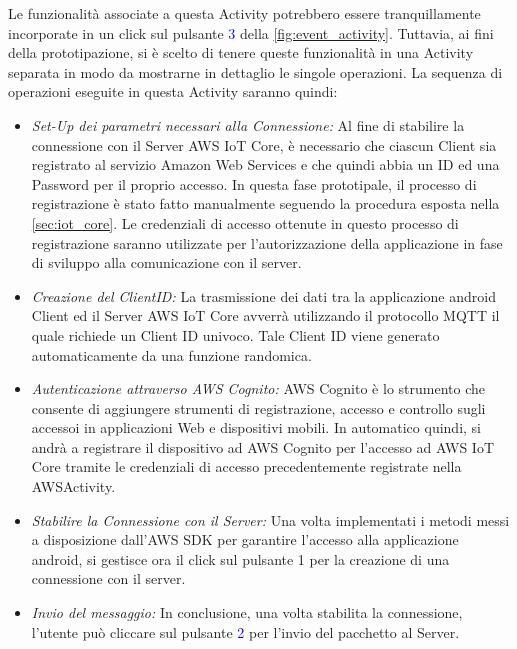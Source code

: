 Le funzionalità associate a questa Activity potrebbero essere tranquillamente incorporate in un click sul pulsante \textcolor{blue}{3} della \autoref{fig:event_activity}. Tuttavia, ai fini della prototipazione, si è scelto di tenere queste funzionalità in una Activity separata in modo da mostrarne in dettaglio le singole operazioni.
La sequenza di operazioni eseguite in questa Activity saranno quindi:
\begin{itemize}
	\item \textit{Set-Up dei parametri necessari alla Connessione:} Al fine di stabilire la connessione con il Server AWS IoT Core, è necessario che ciascun Client sia registrato al servizio Amazon Web Services e che quindi abbia un ID ed una Password per il proprio accesso. In questa fase prototipale, il processo di registrazione è stato fatto manualmente seguendo la procedura esposta nella \autoref{sec:iot_core}. Le credenziali di accesso ottenute in questo processo di registrazione saranno utilizzate per l'autorizzazione della applicazione in fase di sviluppo alla comunicazione con il server.
	
	
	\item \textit{Creazione del ClientID:} La trasmissione dei dati tra la applicazione android Client ed il Server AWS IoT Core avverrà utilizzando il protocollo MQTT il quale richiede un Client ID univoco. Tale Client ID viene generato automaticamente da una funzione randomica.
	
	
	\item \textit{Autenticazione attraverso AWS Cognito:} AWS Cognito è lo strumento che consente di aggiungere strumenti di registrazione, accesso e controllo sugli accessoi in applicazioni Web e dispositivi mobili. In automatico quindi, si andrà a registrare il dispositivo ad AWS Cognito per l'accesso ad AWS IoT Core tramite le credenziali di accesso precedentemente registrate nella AWSActivity.
	
	
	\item \textit{Stabilire la Connessione con il Server:} Una volta implementati i metodi messi a disposizione dall'AWS SDK per garantire l'accesso alla applicazione android, si gestisce ora il click sul pulsante \textcolor{mypink}{1} per la creazione di una connessione con il server.
	
	
	\item \textit{Invio del messaggio:} In conclusione, una volta stabilita la connessione, l'utente può cliccare sul pulsante \textcolor{blue}{2} per l'invio del pacchetto al Server.
		
\end{itemize}

